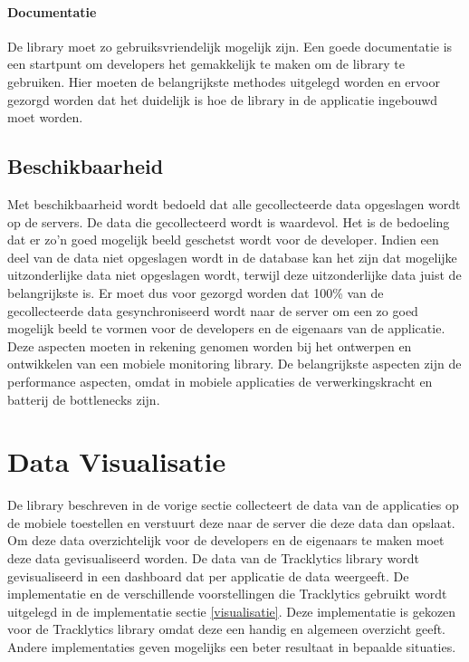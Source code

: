 \paragraph{Documentatie} De library moet zo gebruiksvriendelijk mogelijk zijn. Een goede documentatie is een startpunt om developers het gemakkelijk te maken om de library te gebruiken. Hier moeten de belangrijkste methodes uitgelegd worden en ervoor gezorgd worden dat het duidelijk is hoe de library in de applicatie ingebouwd moet worden. 



\subsection{Beschikbaarheid}
Met beschikbaarheid wordt bedoeld dat alle gecollecteerde data opgeslagen wordt op de servers. De data die gecollecteerd wordt is waardevol. Het is de bedoeling dat er zo'n goed mogelijk beeld geschetst wordt voor de developer. Indien een deel van de data niet opgeslagen wordt in de database kan het zijn dat mogelijke uitzonderlijke data niet opgeslagen wordt, terwijl deze uitzonderlijke data juist de belangrijkste is. Er moet dus voor gezorgd worden dat 100\% van de gecollecteerde data gesynchroniseerd wordt naar de server om een zo goed mogelijk beeld te vormen voor de developers en de eigenaars van de applicatie.\\


Deze aspecten moeten in rekening genomen worden bij het ontwerpen en ontwikkelen van een mobiele monitoring library. De belangrijkste aspecten zijn de performance aspecten, omdat in mobiele applicaties de verwerkingskracht en batterij de bottlenecks zijn. 


\section{Data Visualisatie}
De library beschreven in de vorige sectie collecteert de data van de applicaties op de mobiele toestellen en verstuurt deze naar de server die deze data dan opslaat. Om deze data overzichtelijk voor de developers en de eigenaars te maken moet deze data gevisualiseerd worden. De data van de Tracklytics library wordt gevisualiseerd in een dashboard dat per applicatie de data weergeeft. De implementatie en de verschillende voorstellingen die Tracklytics gebruikt wordt uitgelegd in de implementatie sectie \ref{visualisatie}. Deze implementatie is gekozen voor de Tracklytics library omdat deze een handig en algemeen overzicht geeft. Andere implementaties geven mogelijks een beter resultaat in bepaalde situaties. 

